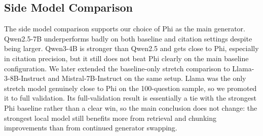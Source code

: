 \documentclass[11pt]{article}
\begin{document}
\subsection{Side Model Comparison}

\begin{table}[t]
\centering
\small
{}
\caption{Side model and stretch-generator comparison under section + \texttt{hybrid\_rerank}. Most rows use the same 100-question sample; the final Llama row is the promoted full-validation stretch run.}
\label{tab:models}
\end{table}

The side model comparison supports our choice of Phi as the main generator. Qwen2.5-7B underperforms badly on both baseline and citation settings despite being larger. Qwen3-4B is stronger than Qwen2.5 and gets close to Phi, especially in citation precision, but it still does not beat Phi clearly on the main baseline configuration. We later extended the baseline-only stretch comparison to Llama-3-8B-Instruct and Mistral-7B-Instruct on the same setup. Llama was the only stretch model genuinely close to Phi on the 100-question sample, so we promoted it to full validation. Its full-validation result is essentially a tie with the strongest Phi baseline rather than a clear win, so the main conclusion does not change: the strongest local model still benefits more from retrieval and chunking improvements than from continued generator swapping.
\end{document}
